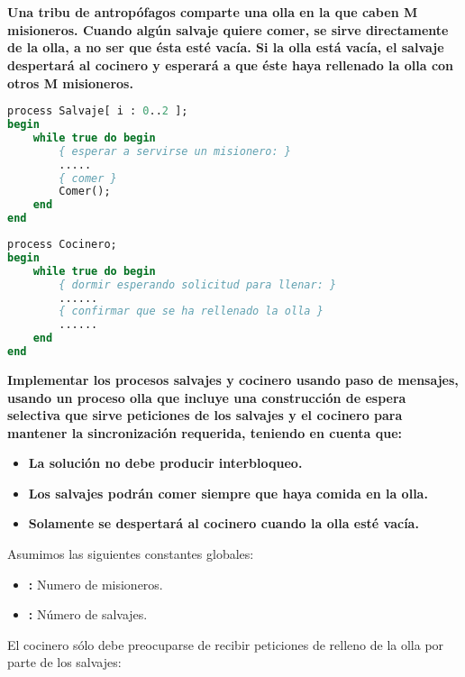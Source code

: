 \section{}

\textbf{Una tribu de antropófagos comparte una olla en la que caben M misioneros.
Cuando algún salvaje quiere comer, se sirve directamente de la olla, a no ser que ésta esté vacía.
Si la olla está vacía, el salvaje despertará al cocinero y esperará a que éste haya rellenado la olla con otros M misioneros.}

\begin{lstlisting}[language=Pascal]
process Salvaje[ i : 0..2 ];
begin
	while true do begin
		{ esperar a servirse un misionero: }
		.....
		{ comer }
		Comer();
	end
end
\end{lstlisting}

\begin{lstlisting}[language=Pascal]
process Cocinero;
begin
	while true do begin
		{ dormir esperando solicitud para llenar: }
		......
		{ confirmar que se ha rellenado la olla }
		......
	end
end
\end{lstlisting}

\textbf{Implementar los procesos salvajes y cocinero usando paso de mensajes, usando un proceso olla que incluye una construcción de espera selectiva que sirve peticiones de los salvajes y el cocinero para mantener la sincronización requerida, teniendo en cuenta que:}

\begin{itemize}
	\item\textbf{La solución no debe producir interbloqueo.}
	\item\textbf{Los salvajes podrán comer siempre que haya comida en la olla.}
	\item\textbf{Solamente se despertará al cocinero cuando la olla esté vacía.}
\end{itemize}

\pagebreak

Asumimos las siguientes constantes globales:

\begin{itemize}
	\item{}\textbf{:} Numero de misioneros.
	\item{}\textbf{:} Número de salvajes.
\end{itemize}

El cocinero sólo debe preocuparse de recibir peticiones de relleno de la olla por parte de los salvajes:

